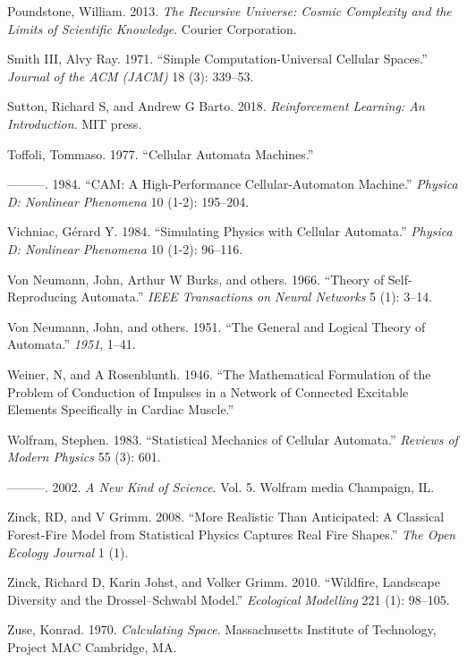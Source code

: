 \documentclass[
]{book}
\newlength{\cslhangindent}
\newenvironment{cslreferences}%
  {\setlength{\parindent}{0pt}%
  \everypar{\setlength{\hangindent}{\cslhangindent}}\ignorespaces}%
  {\par}
\begin{document}
\begin{cslreferences}
\leavevmode\hypertarget{ref-poundstone2013recursive}{}%
Poundstone, William. 2013. \emph{The Recursive Universe: Cosmic Complexity and the Limits of Scientific Knowledge}. Courier Corporation.

\leavevmode\hypertarget{ref-smith1971simple}{}%
Smith III, Alvy Ray. 1971. ``Simple Computation-Universal Cellular Spaces.'' \emph{Journal of the ACM (JACM)} 18 (3): 339--53.

\leavevmode\hypertarget{ref-sutton2018reinforcement}{}%
Sutton, Richard S, and Andrew G Barto. 2018. \emph{Reinforcement Learning: An Introduction}. MIT press.

\leavevmode\hypertarget{ref-toffoli1977cellular}{}%
Toffoli, Tommaso. 1977. ``Cellular Automata Machines.''

\leavevmode\hypertarget{ref-toffoli1984cam}{}%
---------. 1984. ``CAM: A High-Performance Cellular-Automaton Machine.'' \emph{Physica D: Nonlinear Phenomena} 10 (1-2): 195--204.

\leavevmode\hypertarget{ref-vichniac1984simulating}{}%
Vichniac, Gérard Y. 1984. ``Simulating Physics with Cellular Automata.'' \emph{Physica D: Nonlinear Phenomena} 10 (1-2): 96--116.

\leavevmode\hypertarget{ref-von1966theory}{}%
Von Neumann, John, Arthur W Burks, and others. 1966. ``Theory of Self-Reproducing Automata.'' \emph{IEEE Transactions on Neural Networks} 5 (1): 3--14.

\leavevmode\hypertarget{ref-von1951general}{}%
Von Neumann, John, and others. 1951. ``The General and Logical Theory of Automata.'' \emph{1951}, 1--41.

\leavevmode\hypertarget{ref-weiner1946mathematical}{}%
Weiner, N, and A Rosenblunth. 1946. ``The Mathematical Formulation of the Problem of Conduction of Impulses in a Network of Connected Excitable Elements Specifically in Cardiac Muscle.''

\leavevmode\hypertarget{ref-wolfram1983statistical}{}%
Wolfram, Stephen. 1983. ``Statistical Mechanics of Cellular Automata.'' \emph{Reviews of Modern Physics} 55 (3): 601.

\leavevmode\hypertarget{ref-wolfram2002new}{}%
---------. 2002. \emph{A New Kind of Science}. Vol. 5. Wolfram media Champaign, IL.

\leavevmode\hypertarget{ref-zinck2008more}{}%
Zinck, RD, and V Grimm. 2008. ``More Realistic Than Anticipated: A Classical Forest-Fire Model from Statistical Physics Captures Real Fire Shapes.'' \emph{The Open Ecology Journal} 1 (1).

\leavevmode\hypertarget{ref-zinck2010wildfire}{}%
Zinck, Richard D, Karin Johst, and Volker Grimm. 2010. ``Wildfire, Landscape Diversity and the Drossel--Schwabl Model.'' \emph{Ecological Modelling} 221 (1): 98--105.

\leavevmode\hypertarget{ref-zuse1970calculating}{}%
Zuse, Konrad. 1970. \emph{Calculating Space}. Massachusetts Institute of Technology, Project MAC Cambridge, MA.
\end{cslreferences}
\end{document}
